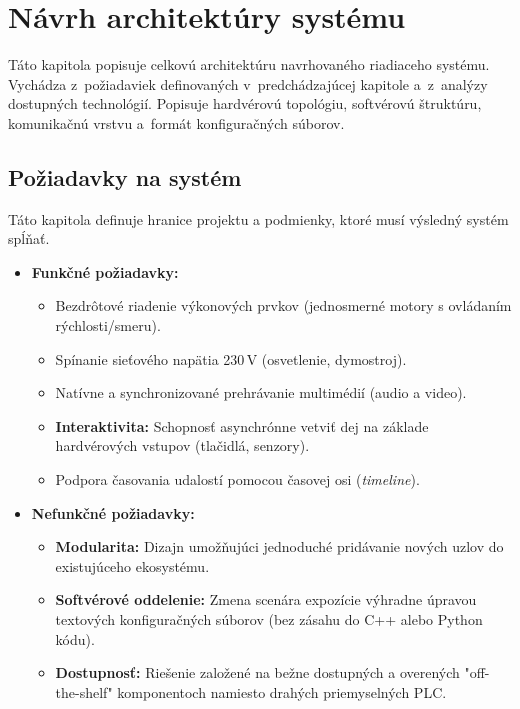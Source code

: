 \chapter{Návrh architektúry systému}
\label{NavrhArchitektury}

Táto kapitola popisuje celkovú architektúru navrhovaného riadiaceho systému. Vychádza z~požiadaviek definovaných v~predchádzajúcej kapitole a~z~analýzy dostupných technológií. Popisuje hardvérovú topológiu, softvérovú štruktúru, komunikačnú vrstvu a~formát konfiguračných súborov.

\section{Požiadavky na systém}
\label{PoziadavkyNaSystem}

Táto kapitola definuje hranice projektu a podmienky, ktoré musí výsledný systém spĺňať.

\begin{itemize}
    \item \textbf{Funkčné požiadavky:}
    \begin{itemize}
        \item Bezdrôtové riadenie výkonových prvkov (jednosmerné motory s ovládaním rýchlosti/smeru).
        \item Spínanie sieťového napätia 230\,V (osvetlenie, dymostroj).
        \item Natívne a synchronizované prehrávanie multimédií (audio a video).
        \item \textbf{Interaktivita:} Schopnosť asynchrónne vetviť dej na základe hardvérových vstupov (tlačidlá, senzory).
        \item Podpora časovania udalostí pomocou časovej osi (\textit{timeline}).
    \end{itemize}
    \item \textbf{Nefunkčné požiadavky:}
    \begin{itemize}
        \item \textbf{Modularita:} Dizajn umožňujúci jednoduché pridávanie nových uzlov do existujúceho ekosystému.
        \item \textbf{Softvérové oddelenie:} Zmena scenára expozície výhradne úpravou textových konfiguračných súborov (bez zásahu do C++ alebo Python kódu).
        \item \textbf{Dostupnosť:} Riešenie založené na bežne dostupných a overených "off-the-shelf" komponentoch namiesto drahých priemyselných PLC.
    \end{itemize}
\end{itemize}


